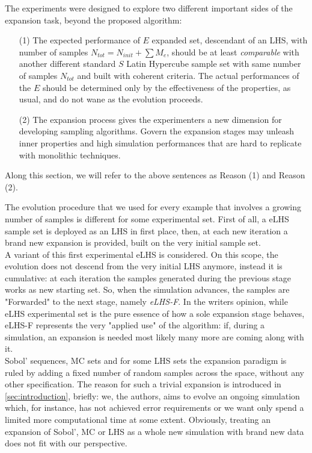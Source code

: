\documentclass[12pt]{extarticle}
\begin{document}
The experiments were designed to explore two different important sides of the expansion task, beyond the proposed algorithm:

\begin{enumerate}
\item[(1)] The expected performance of $E$ expanded set, descendant of an LHS, with number of samples $N_{tot} = N_{init} + \sum{M_e}$, should be at least \textit{comparable} with another different standard $S$ Latin Hypercube sample set with same number of samples $N_{tot}$ and built with coherent criteria. The actual performances of the $E$ should be determined only by the effectiveness of the properties, as usual, and do not wane as the evolution proceeds. 

\item[(2)] The expansion process gives the experimenters a new dimension for developing sampling algorithms. Govern the expansion stages may unleash inner properties and high simulation performances that are hard to replicate with monolithic techniques.
\end{enumerate}

Along this section, we will refer to the above sentences as Reason (1) and Reason (2).

The evolution procedure that we used for every example that involves a growing number of samples is different for some experimental set. First of all, a eLHS sample set is deployed as an LHS in first place, then, at each new iteration a brand new expansion is provided, built on the very initial sample set. \\
A variant of this first experimental eLHS is considered. On this scope, the evolution does not descend from the very initial LHS anymore, instead it is cumulative: at each iteration the samples generated during the previous stage works as new starting set. So, when the simulation advances, the samples are "Forwarded" to the next stage, namely \textit{eLHS-F}. In the writers opinion, while eLHS experimental set is the pure essence of how a sole expansion stage behaves, eLHS-F represents the very "applied use" of the algorithm: if, during a simulation, an expansion is needed most likely many more are coming along with it.\\
Sobol' sequences, MC sets and for some LHS sets the expansion paradigm is ruled by adding a fixed number of random samples across the space, without any other specification. The reason for such a trivial expansion is introduced in \cref{sec:introduction}, briefly: we, the authors, aims to evolve an ongoing simulation which, for instance, has not achieved error requirements or we want only spend a limited more computational time at some extent. Obviously, treating an expansion of Sobol', MC or LHS as a whole new simulation with brand new data does not fit with our perspective.
\end{document}
